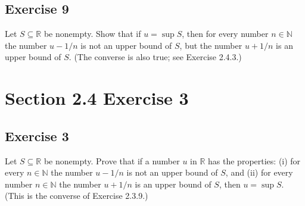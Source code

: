 \documentclass[12pt]{article}
\begin{document}
\subsection*{Exercise 9}
Let $S \subseteq \mathbb{R}$ be nonempty. Show that if $u = \sup S$, then for every number $n \in \mathbb{N}$ the number $u - 1/n$ is not an upper bound of $S$, but the number $u + 1/n$ is an upper bound of $S$. (The converse is also true; see Exercise 2.4.3.)

\section*{Section 2.4 Exercise 3}
\subsection*{Exercise 3}
Let $S \subseteq \mathbb{R}$ be nonempty. Prove that if a number $u$ in $\mathbb{R}$ has the properties: (i) for every $n \in \mathbb{N}$ the number $u - 1/n$ is not an upper bound of $S$, and (ii) for every number $n \in \mathbb{N}$ the number $u + 1/n$ is an upper bound of $S$, then $u = \sup S$. (This is the converse of Exercise 2.3.9.)
\end{document}
